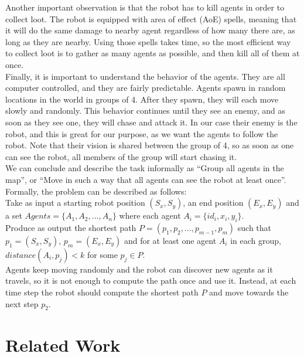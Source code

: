 \documentclass[]{article}
\begin{document}
Another important observation is that the robot has to kill agents in order to collect loot. The robot is equipped with area of effect (AoE) spells, meaning that it will do the same damage to nearby agent regardless of how many there are, as long as they are nearby. Using those spells takes time, so the most efficient way to collect loot is to gather as many agents as possible, and then kill all of them at once. \\

Finally, it is important to understand the behavior of the agents. They are all computer controlled, and they are fairly predictable. Agents spawn in random locations in the world in groups of 4. After they spawn, they will each move slowly and randomly. This behavior continues until they see an enemy, and as soon as they see one, they will chase and attack it. In our case their enemy is the robot, and this is great for our purpose, as we want the agents to follow the robot. Note that their vision is shared between the group of 4, so as soon as one can see the robot, all members of the group will start chasing it. \\

We can conclude and describe the task informally as ``Group all agents in the map'', or ``Move in such a way that all agents can see the robot at least once''. \\

Formally, the problem can be described as follows: \\
Take as input a starting robot position $(S_x, S_y)$, an end position $(E_x, E_y)$ and a set $Agents = \{A_1, A_2, ..., A_n\}$ where each agent $A_i = \{id_i, x_i, y_i\}$. \\
Produce as output the shortest path $P = (p_1, p_2, ..., p_{m-1}, p_m)$ such that $p_1 = (S_x, S_y)$, $p_m = (E_x, E_y)$ and for at least one agent $A_i$ in each group, $distance(A_i, p_j) < k$ for some $p_j \in P$. \\

Agents keep moving randomly and the robot can discover new agents as it travels, so it is not enough to compute the path once and use it. Instead, at each time step the robot should compute the shortest path $P$ and move towards the next step $p_2$.

\section{Related Work}
\end{document}
